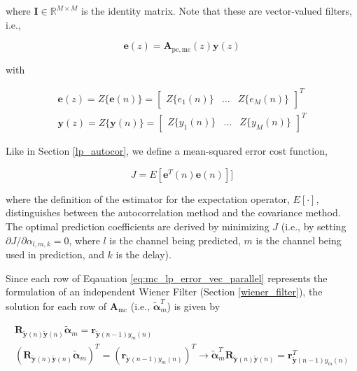\noindent
where $\boldsymbol{I} \in \mathbb{R}^{M \times M}$ is the identity matrix. Note that these are vector-valued filters, i.e., 

\begin{equation}
	\boldsymbol{e}(z) = \boldsymbol{A}_{\mathrm{pe,mc}}(z) \boldsymbol{y}(z)
\end{equation}

\noindent
with 

\noindent
\begin{eqnarray}
	\boldsymbol{e}(z) = Z\{\boldsymbol{e}(n)\} = \begin{bmatrix} Z\{e_1(n)\} & \dots & Z\{e_M(n)\} \end{bmatrix}^T\\
	\boldsymbol{y}(z) = Z\{\boldsymbol{y}(n)\} = \begin{bmatrix} Z\{y_1(n)\} & \dots & Z\{y_M(n)\} \end{bmatrix}^T
\end{eqnarray}

Like in Section \ref{lp_autocor}, we define a mean-squared error cost function, 

\begin{equation}
	J = E[\boldsymbol{e}^T(n)\boldsymbol{e}(n)]]
\end{equation}

\noindent
where the definition of the estimator for the expectation operator, $E[\cdot]$, distinguishes between the autocorrelation method and the covariance method. The optimal prediction coefficients are derived by minimizing $J$ (i.e., by setting $\partial J/\partial \alpha_{l,m,k}=0$, where $l$ is the channel being predicted, $m$ is the channel being used in prediction, and $k$ is the delay). 

Since each row of Eqauation \ref{eq:mc_lp_error_vec_parallel} represents the formulation of an independent Wiener Filter (Section \ref{wiener_filter}), the solution for each row of $\boldsymbol{A}_{\mathrm{mc}}$ (i.e., $\boldsymbol{\tilde{\alpha}}^T_m$) is given by

\begin{eqnarray}
	\boldsymbol{R}_{\boldsymbol{\tilde{y}}(n)\boldsymbol{\tilde{y}}(n)} \boldsymbol{\tilde{\alpha}}_m =
	\boldsymbol{r}_{\boldsymbol{\tilde{y}}(n-1)y_m(n)}  \\
	(\boldsymbol{R}_{\boldsymbol{\tilde{y}}(n)\boldsymbol{\tilde{y}}(n)} \boldsymbol{\tilde{\alpha}}_m)^T =
	(\boldsymbol{r}_{\boldsymbol{\tilde{y}}(n-1)y_m(n)})^T \rightarrow
	\boldsymbol{\tilde{\alpha}}^T_m  \boldsymbol{R}_{\boldsymbol{\tilde{y}}(n)\boldsymbol{\tilde{y}}(n)} =  \boldsymbol{r}^T_{\boldsymbol{\tilde{y}}(n-1)y_m(n)} %
\end{eqnarray}

